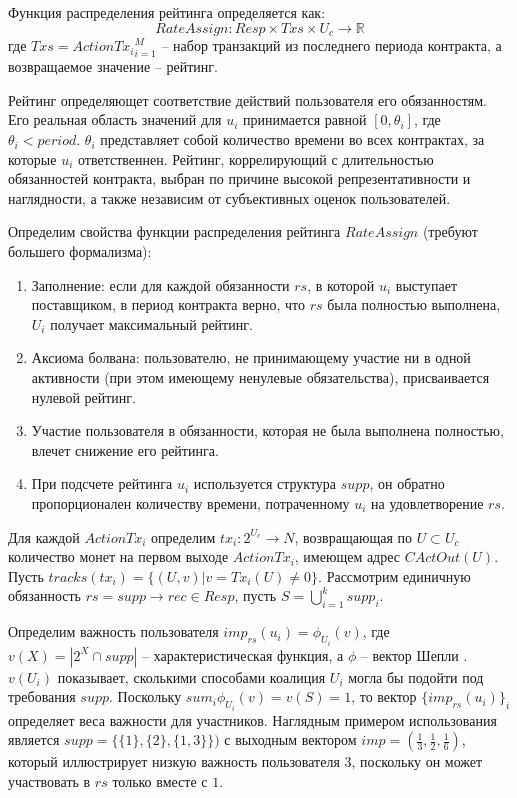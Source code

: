 \documentclass[specification,annotation]{itmo-student-thesis}
\begin{document}
Функция распределения рейтинга определяется как:
\[RateAssign : Resp \times Txs \times U_c \rightarrow \mathbb{R}\]
где $Txs = {ActionTx_i}_{i=1}^M$ -- набор транзакций из последнего
периода контракта, а возвращаемое значение -- рейтинг.

Рейтинг определяющет соответствие действий пользователя его
обязанностям. Его реальная область значений для $u_i$ принимается
равной $[0,\theta_i]$, где $\theta_i < period$. $\theta_i$ представляет
собой количество времени во всех контрактах, за которые $u_i$
ответственнен. Рейтинг, коррелирующий с длительностью обязанностей
контракта, выбран по причине высокой репрезентативности и наглядности,
а также независим от субъективных оценок пользователей.

Определим свойства функции распределения рейтинга $RateAssign$
(требуют большего формализма):

\begin{enumerate}
\item Заполнение: если для каждой обязанности $rs$, в которой $u_i$
  выступает поставщиком, в период контракта верно, что $rs$ была
  полностью выполнена, $U_i$ получает максимальный рейтинг.
\item Аксиома болвана: пользователю, не принимающему участие ни в
  одной активности (при этом имеющему ненулевые обязательства),
  присваивается нулевой рейтинг.
\item Участие пользователя в обязанности, которая не была выполнена
  полностью, влечет снижение его рейтинга.
\item При подсчете рейтинга $u_i$ используется структура $supp$, он
  обратно пропорционален количеству времени, потраченному $u_i$ на
  удовлетворение $rs$.
\end{enumerate}

Для каждой $ActionTx_i$ определим $tx_i : 2^{U_c} \rightarrow N$,
возвращающая по $U \subset U_c$ количество монет на первом выходе
$ActionTx_i$, имеющем адрес $CActOut(U)$. Пусть $tracks(tx_i) = \{
(U,v) | v = Tx_i(U) \neq 0 \}$. Рассмотрим единичную обязанность $rs =
supp \rightarrow rec \in Resp$, пусть $S = \bigcup_{i=1}^{k}{supp_i}$.

Определим важность пользователя $imp_{rs}(u_i) = \phi_{U_i}(v)$, где
$v(X) = |2^X \cap supp|$ -- характеристическая функция, а $\phi$ --
вектор Шепли \cite{shapley} \cite{petrosyan}. $v(U_i)$ показывает,
сколькими способами коалиция $U_i$ могла бы подойти под требования
$supp$. Поскольку $sum_i{\phi_{U_i}(v)} = v(S) = 1$, то вектор
$\{imp_{rs}(u_i)\}_i$ определяет веса важности для
участников. Наглядным примером использования является $supp =
\{\{1\},\{2\},\{1,3\}\})$ с выходным вектором $imp = (\frac{1}{3},
\frac{1}{2}, \frac{1}{6})$, который иллюстрирует низкую важность
пользователя $3$, поскольку он может участвовать в $rs$ только вместе
с $1$.
\end{document}
